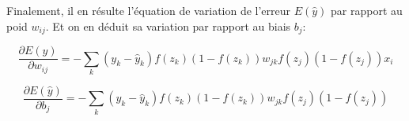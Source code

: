 \documentclass{article}
\begin{document}
Finalement, il en résulte l'équation de variation de l'erreur $E(\hat{y})$ par rapport au poid $w_{ij}$. Et on en déduit sa variation par rapport au biais $b_j$:

$$\frac{\partial{E(\hat{y})}}{\partial{w_{ij}}}=-\sum_k{(y_k-\hat{y}_k){f(z_k)(1-f(z_k))}w_{jk}{f(z_j)(1-f(z_j))}x_i}$$

$$\frac{\partial{E(\hat{y})}}{\partial{b_j}}=-\sum_k{(y_k-\hat{y}_k){f(z_k)(1-f(z_k))}w_{jk}{f(z_j)(1-f(z_j))}}$$
\end{document}
